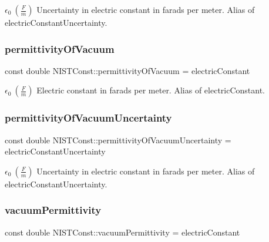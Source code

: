 $\epsilon_0 \ (\frac{F}{m})$ Uncertainty in electric constant in farads per meter. Alias of electric\+Constant\+Uncertainty. \mbox{\label{group___n_i_s_t_const-_electric_constant_ga81378e87b977f5b3403002e187d3d22c}} 
\subsubsection{\texorpdfstring{permittivity\+Of\+Vacuum}{permittivityOfVacuum}}
{\footnotesize\ttfamily const double N\+I\+S\+T\+Const\+::permittivity\+Of\+Vacuum = electric\+Constant}

$\epsilon_0 \ (\frac{F}{m})$ Electric constant in farads per meter. Alias of electric\+Constant. \mbox{\label{group___n_i_s_t_const-_electric_constant_ga4f15fd528291e6284d5fc3ad58c5a97a}} 
\subsubsection{\texorpdfstring{permittivity\+Of\+Vacuum\+Uncertainty}{permittivityOfVacuumUncertainty}}
{\footnotesize\ttfamily const double N\+I\+S\+T\+Const\+::permittivity\+Of\+Vacuum\+Uncertainty = electric\+Constant\+Uncertainty}

$\epsilon_0 \ (\frac{F}{m})$ Uncertainty in electric constant in farads per meter. Alias of electric\+Constant\+Uncertainty. \mbox{\label{group___n_i_s_t_const-_electric_constant_ga46294f940b4149602e7bef336431c7dd}} 
\subsubsection{\texorpdfstring{vacuum\+Permittivity}{vacuumPermittivity}}
{\footnotesize\ttfamily const double N\+I\+S\+T\+Const\+::vacuum\+Permittivity = electric\+Constant}

